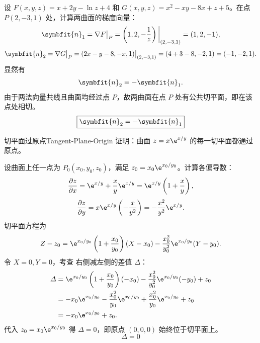 \begin{myproof}
    设 $F(x, y, z) = x + 2y - \ln z + 4$ 和 $G(x, y, z) = x^2 - xy - 8x + z + 5$。在点 $P(2, -3, 1)$ 处，计算两曲面的梯度向量：
    \begin{equation}
        \symbfit{n}_1 = \nabla F \big|_P = \left( 1, 2, -\frac{1}{z} \right) \bigg|_{(2, -3, 1)} = (1, 2, -1),
    \end{equation}
    \begin{equation}
        \symbfit{n}_2 = \nabla G \big|_P = (2x - y - 8, -x, 1) \big|_{(2, -3, 1)} = (4 + 3 - 8, -2, 1) = (-1, -2, 1).
    \end{equation}
    显然有
    \begin{equation}
        \symbfit{n}_2 = - \symbfit{n}_1.
    \end{equation}
    由于两法向量共线且曲面均经过点 $P$，故两曲面在点 $P$ 处有公共切平面，即在该点处相切。
    \begin{equation}
        \boxed{\symbfit{n}_2 = -\symbfit{n}_1}
    \end{equation}
\end{myproof}


\begin{problem}{切平面过原点}{Tangent-Plane-Origin}
    证明：曲面 $z = x \e^{x/y}$ 的每一切平面都通过原点。
\end{problem}

\begin{myproof}
    设曲面上任一点为 $P_0(x_0, y_0, z_0)$，满足 $z_0 = x_0 \e^{x_0/y_0}$。计算各偏导数：
    \begin{equation}
        \frac{\partial z}{\partial x} = \e^{x/y} + \frac{x}{y} \e^{x/y} = \e^{x/y} \left( 1 + \frac{x}{y} \right),
    \end{equation}
    \begin{equation}
        \frac{\partial z}{\partial y} = x \e^{x/y} \left( -\frac{x}{y^2} \right) = -\frac{x^2}{y^2} \e^{x/y}.
    \end{equation}
    切平面方程为
    \begin{equation}\label{eq:tangent-plane-eq}
        Z - z_0 = \e^{x_0/y_0} \left( 1 + \frac{x_0}{y_0} \right) (X - x_0) - \frac{x_0^2}{y_0^2} \e^{x_0/y_0} (Y - y_0).
    \end{equation}
    令 $X=0, Y=0$，考查  右侧减左侧的差值 $\varDelta$：
    \begin{equation}
        \begin{aligned}
            \varDelta & = \e^{x_0/y_0} \left( 1 + \frac{x_0}{y_0} \right) (-x_0) - \frac{x_0^2}{y_0^2} \e^{x_0/y_0} (-y_0) + z_0 \\
                      & = -x_0 \e^{x_0/y_0} - \frac{x_0^2}{y_0} \e^{x_0/y_0} + \frac{x_0^2}{y_0} \e^{x_0/y_0} + z_0              \\
                      & = -x_0 \e^{x_0/y_0} + z_0.
        \end{aligned}
    \end{equation}
    代入 $z_0 = x_0 \e^{x_0/y_0}$ 得 $\varDelta = 0$，即原点 $(0, 0, 0)$ 始终位于切平面上。
    \begin{equation}
        \boxed{\varDelta = 0}
    \end{equation}
\end{myproof}



